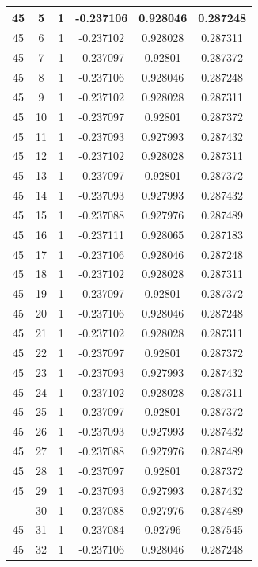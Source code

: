 \documentclass[12pt,a4paper]{article}
\numberwithin{equation}{section}
\numberwithin{figure}{section}
\numberwithin{table}{section}
\begin{document}
\begin{longtable}{|c|c|c|c|c|c|}
45 & 5 & 1 & -0.237106 & 0.928046 & 0.287248 \\ \hline
45 & 6 & 1 & -0.237102 & 0.928028 & 0.287311 \\ \hline
45 & 7 & 1 & -0.237097 & 0.92801 & 0.287372 \\ \hline
45 & 8 & 1 & -0.237106 & 0.928046 & 0.287248 \\ \hline
45 & 9 & 1 & -0.237102 & 0.928028 & 0.287311 \\ \hline
45 & 10 & 1 & -0.237097 & 0.92801 & 0.287372 \\ \hline
45 & 11 & 1 & -0.237093 & 0.927993 & 0.287432 \\ \hline
45 & 12 & 1 & -0.237102 & 0.928028 & 0.287311 \\ \hline
45 & 13 & 1 & -0.237097 & 0.92801 & 0.287372 \\ \hline
45 & 14 & 1 & -0.237093 & 0.927993 & 0.287432 \\ \hline
45 & 15 & 1 & -0.237088 & 0.927976 & 0.287489 \\ \hline
45 & 16 & 1 & -0.237111 & 0.928065 & 0.287183 \\ \hline
45 & 17 & 1 & -0.237106 & 0.928046 & 0.287248 \\ \hline
45 & 18 & 1 & -0.237102 & 0.928028 & 0.287311 \\ \hline
45 & 19 & 1 & -0.237097 & 0.92801 & 0.287372 \\ \hline
45 & 20 & 1 & -0.237106 & 0.928046 & 0.287248 \\ \hline
45 & 21 & 1 & -0.237102 & 0.928028 & 0.287311 \\ \hline
45 & 22 & 1 & -0.237097 & 0.92801 & 0.287372 \\ \hline
45 & 23 & 1 & -0.237093 & 0.927993 & 0.287432 \\ \hline
45 & 24 & 1 & -0.237102 & 0.928028 & 0.287311 \\ \hline
45 & 25 & 1 & -0.237097 & 0.92801 & 0.287372 \\ \hline
45 & 26 & 1 & -0.237093 & 0.927993 & 0.287432 \\ \hline
45 & 27 & 1 & -0.237088 & 0.927976 & 0.287489 \\ \hline
45 & 28 & 1 & -0.237097 & 0.92801 & 0.287372 \\ \hline
45 & 29 & 1 & -0.237093 & 0.927993 & 0.287432 \\ \hline
\pagebreak
45 & 30 & 1 & -0.237088 & 0.927976 & 0.287489 \\ \hline
45 & 31 & 1 & -0.237084 & 0.92796 & 0.287545 \\ \hline
45 & 32 & 1 & -0.237106 & 0.928046 & 0.287248 \\ \hline

\end{longtable}
\end{document}

